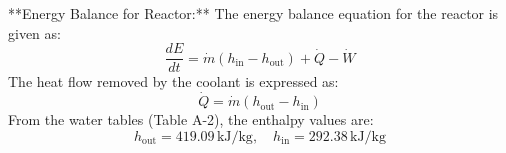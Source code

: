**Energy Balance for Reactor:**  
The energy balance equation for the reactor is given as:  
\[
\frac{dE}{dt} = \dot{m} \left( h_{\text{in}} - h_{\text{out}} \right) + \dot{Q} - \dot{W}
\]  
The heat flow removed by the coolant is expressed as:  
\[
\dot{Q} = \dot{m} \left( h_{\text{out}} - h_{\text{in}} \right)
\]  
From the water tables (Table A-2), the enthalpy values are:  
\[
h_{\text{out}} = 419.09 \, \text{kJ/kg}, \quad h_{\text{in}} = 292.38 \, \text{kJ/kg}
\]